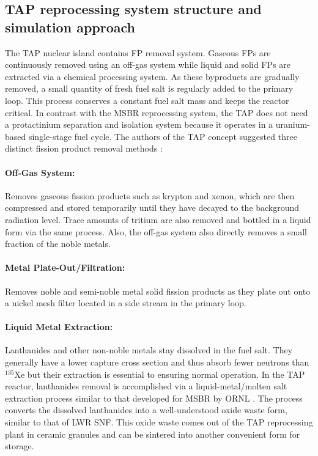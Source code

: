 \documentclass[12pt]{article} %
\begin{document}
\subsection{TAP reprocessing system structure and simulation approach}
The \gls{TAP} nuclear island contains \gls{FP} removal system. Gaseous 
\glspl{FP} are continuously removed using an off-gas system while liquid 
and solid \glspl{FP} are extracted via a chemical processing system. As 
these byproducts are gradually removed, a small quantity 
of fresh fuel salt is regularly added to the primary loop. This process conserves a 
constant fuel salt mass and keeps the reactor critical. In contrast with the \gls{MSBR} 
reprocessing system, the \gls{TAP} does not need a protactinium separation and isolation 
system because it operates in a uranium-based single-stage fuel cycle. The authors of 
the \gls{TAP} concept suggested three distinct fission product removal methods 
\cite{transatomic_power_corporation_neutronics_2016}:
\paragraph{Off-Gas System:} Removes gaseous fission products such as krypton 
and xenon, 
which are then compressed and stored temporarily until they have decayed to the 
background 
radiation level. Trace amounts of tritium are also removed and bottled in a liquid 
form via the same process. Also, the off-gas system also directly 
removes a small fraction of the noble metals.
\paragraph{Metal Plate-Out/Filtration:} Removes noble and semi-noble metal 
solid fission 
products as they plate out onto a nickel mesh filter located in a side stream in the 
primary loop.
\paragraph{Liquid Metal Extraction:} Lanthanides and other non-noble 
metals stay dissolved in the fuel salt. They generally have a lower capture cross 
section and thus absorb fewer neutrons than $^{135}$Xe but their extraction is essential 
to ensuring normal operation. In the \gls{TAP} reactor, lanthanides removal is
accomplished via 
a liquid-metal/molten salt extraction process similar to that developed for \gls{MSBR} 
by \gls{ORNL} \cite{robertson_conceptual_1971}. The process 
converts the dissolved lanthanides into a well-understood oxide waste form, similar to 
that of \gls{LWR} \gls{SNF}. This oxide waste comes out of the \gls{TAP} reprocessing 
plant in ceramic granules and can be sintered into another convenient form for storage.
\end{document}
